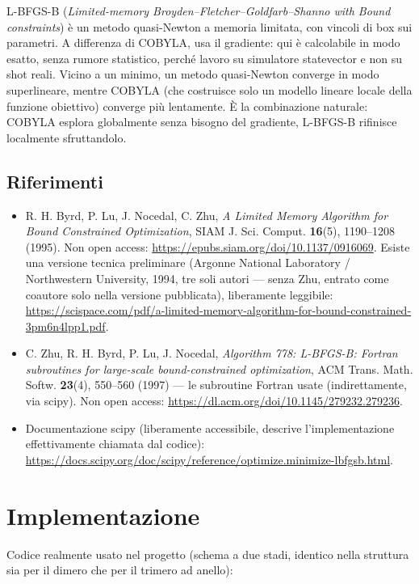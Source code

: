 \documentclass[11pt,a4paper]{article}
\begin{document}
L-BFGS-B (\emph{Limited-memory Broyden--Fletcher--Goldfarb--Shanno with Bound constraints}) è un metodo quasi-Newton a memoria limitata, con vincoli di box sui parametri. A differenza di COBYLA, usa il gradiente: qui è calcolabile in modo esatto, senza rumore statistico, perché lavoro su simulatore statevector e non su shot reali. Vicino a un minimo, un metodo quasi-Newton converge in modo superlineare, mentre COBYLA (che costruisce solo un modello lineare locale della funzione obiettivo) converge più lentamente. È la combinazione naturale: COBYLA esplora globalmente senza bisogno del gradiente, L-BFGS-B rifinisce localmente sfruttandolo.

\subsection{Riferimenti}

\begin{itemize}[leftmargin=1.3em]
\item R. H. Byrd, P. Lu, J. Nocedal, C. Zhu, \emph{A Limited Memory Algorithm for Bound Constrained Optimization}, SIAM J. Sci. Comput. \textbf{16}(5), 1190--1208 (1995). Non open access: \url{https://epubs.siam.org/doi/10.1137/0916069}. Esiste una versione tecnica preliminare (Argonne National Laboratory / Northwestern University, 1994, tre soli autori — senza Zhu, entrato come coautore solo nella versione pubblicata), liberamente leggibile: \url{https://scispace.com/pdf/a-limited-memory-algorithm-for-bound-constrained-3pm6n4lpp1.pdf}.
\item C. Zhu, R. H. Byrd, P. Lu, J. Nocedal, \emph{Algorithm 778: L-BFGS-B: Fortran subroutines for large-scale bound-constrained optimization}, ACM Trans. Math. Softw. \textbf{23}(4), 550--560 (1997) — le subroutine Fortran usate (indirettamente, via scipy). Non open access: \url{https://dl.acm.org/doi/10.1145/279232.279236}.
\item Documentazione scipy (liberamente accessibile, descrive l'implementazione effettivamente chiamata dal codice): \url{https://docs.scipy.org/doc/scipy/reference/optimize.minimize-lbfgsb.html}.
\end{itemize}

\section{Implementazione}

Codice realmente usato nel progetto (schema a due stadi, identico nella struttura sia per il dimero che per il trimero ad anello):
\end{document}
